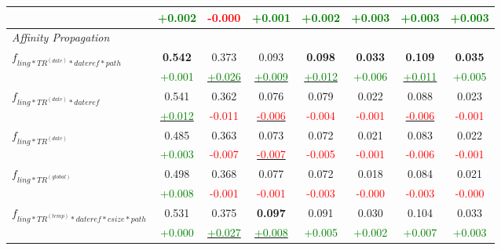 \documentclass[a4paper,BCOR=10mm]{report}
\numberwithin{lemma}{chapter}
\numberwithin{definition}{chapter}
\begin{document}
\begin{table}
\begin{centering}
{\begin{tabular}{|l|ccccccc|}
    & \small \textcolor{green}{+0.002}  & \small \textcolor{red}{-0.000}    & \small \textcolor{green}{+0.001}  & \small \textcolor{green}{+0.002}  & \small \textcolor{green}{+0.003}  & \small \textcolor{green}{+0.003}  & \small \textcolor{green}{+0.003} \\\hline
\multicolumn{ 8 }{|l|}{ \textit{ Affinity Propagation } }\\\hline
\multirow{2}{*}{$f_{ ling*TR^{(date)}*\mathit{dateref}*\mathit{path} }$}    & \textbf{ 0.542 }  & 0.373 & 0.093 & \textbf{ 0.098 }  & \textbf{ 0.033 }  & \textbf{ 0.109 }  & \textbf{ 0.035 } \\
    & \small \textcolor{green}{+0.001}  & \underline{\small \textcolor{green}{+0.026}}  & \underline{\small \textcolor{green}{+0.009}}  & \underline{\small \textcolor{green}{+0.012}}  & \small \textcolor{green}{+0.006}  & \underline{\small \textcolor{green}{+0.011}}  & \small \textcolor{green}{+0.005} \\\hline
\multirow{2}{*}{$f_{ ling*TR^{(date)}*\mathit{dateref} }$}    & 0.541 & 0.362 & 0.076 & 0.079 & 0.022 & 0.088 & 0.023 \\
    & \underline{\small \textcolor{green}{+0.012}}  & \small \textcolor{red}{-0.011}    & \underline{\small \textcolor{red}{-0.006}}    & \small \textcolor{red}{-0.004}    & \small \textcolor{red}{-0.001}    & \underline{\small \textcolor{red}{-0.006}}    & \small \textcolor{red}{-0.001} \\\hline
\multirow{2}{*}{$f_{ ling*TR^{(date)} }$}   & 0.485 & 0.363 & 0.073 & 0.072 & 0.021 & 0.083 & 0.022 \\
    & \small \textcolor{green}{+0.003}  & \small \textcolor{red}{-0.007}    & \underline{\small \textcolor{red}{-0.007}}    & \small \textcolor{red}{-0.005}    & \small \textcolor{red}{-0.001}    & \small \textcolor{red}{-0.006}    & \small \textcolor{red}{-0.001} \\\hline
\multirow{2}{*}{$f_{ ling*TR^{(global)} }$} & 0.498 & 0.368 & 0.077 & 0.072 & 0.018 & 0.084 & 0.021 \\
    & \small \textcolor{green}{+0.008}  & \small \textcolor{red}{-0.001}    & \small \textcolor{red}{-0.001}    & \small \textcolor{red}{-0.003}    & \small \textcolor{red}{-0.000}    & \small \textcolor{red}{-0.003}    & \small \textcolor{red}{-0.000} \\\hline
\multirow{2}{*}{$f_{ ling*TR^{(temp)}*\mathit{dateref}*\mathit{csize}*\mathit{path} }$}   & 0.531 & 0.375 & \textbf{ 0.097 }  & 0.091 & 0.030 & 0.104 & 0.033 \\
    & \small \textcolor{green}{+0.000}  & \underline{\small \textcolor{green}{+0.027}}  & \underline{\small \textcolor{green}{+0.008}}  & \small \textcolor{green}{+0.005}  & \small \textcolor{green}{+0.002}  & \small \textcolor{green}{+0.007}  & \small \textcolor{green}{+0.003} \\\hline

\end{tabular}}
\end{centering}
\end{table}
\end{document}
